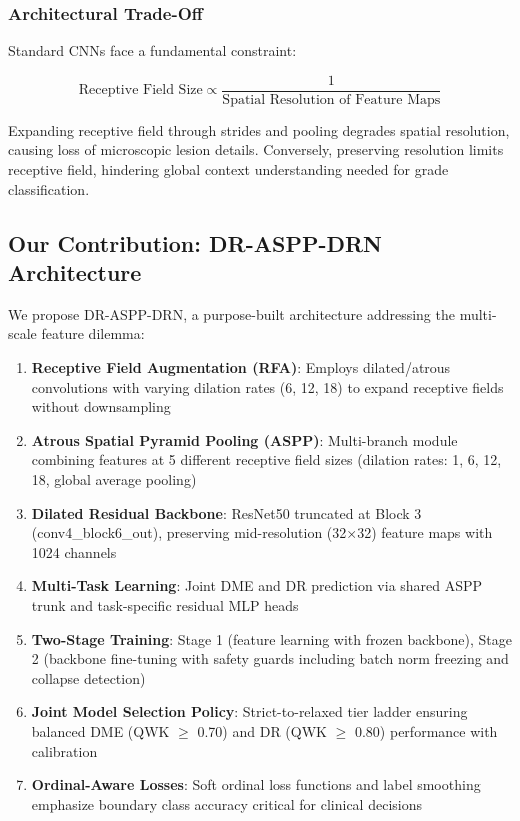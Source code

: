 \documentclass[12pt,a4paper]{article}
\begin{document}
\subsubsection{Architectural Trade-Off}

Standard CNNs face a fundamental constraint:

\begin{equation}
\text{Receptive Field Size} \propto \frac{1}{\text{Spatial Resolution of Feature Maps}}
\end{equation}

Expanding receptive field through strides and pooling degrades spatial resolution, causing loss of microscopic lesion details. Conversely, preserving resolution limits receptive field, hindering global context understanding needed for grade classification.

\subsection{Our Contribution: DR-ASPP-DRN Architecture}

We propose DR-ASPP-DRN, a purpose-built architecture addressing the multi-scale feature dilemma:

\begin{enumerate}
    \item \textbf{Receptive Field Augmentation (RFA)}: Employs dilated/atrous convolutions with varying dilation rates (6, 12, 18) to expand receptive fields without downsampling
    
    \item \textbf{Atrous Spatial Pyramid Pooling (ASPP)}: Multi-branch module combining features at 5 different receptive field sizes (dilation rates: 1, 6, 12, 18, global average pooling)
    
    \item \textbf{Dilated Residual Backbone}: ResNet50 truncated at Block 3 (conv4\_block6\_out), preserving mid-resolution (32×32) feature maps with 1024 channels
    
    \item \textbf{Multi-Task Learning}: Joint DME and DR prediction via shared ASPP trunk and task-specific residual MLP heads
    
    \item \textbf{Two-Stage Training}: Stage 1 (feature learning with frozen backbone), Stage 2 (backbone fine-tuning with safety guards including batch norm freezing and collapse detection)
    
    \item \textbf{Joint Model Selection Policy}: Strict-to-relaxed tier ladder ensuring balanced DME (QWK $\geq$ 0.70) and DR (QWK $\geq$ 0.80) performance with calibration
    
    \item \textbf{Ordinal-Aware Losses}: Soft ordinal loss functions and label smoothing emphasize boundary class accuracy critical for clinical decisions
\end{enumerate}
\end{document}
